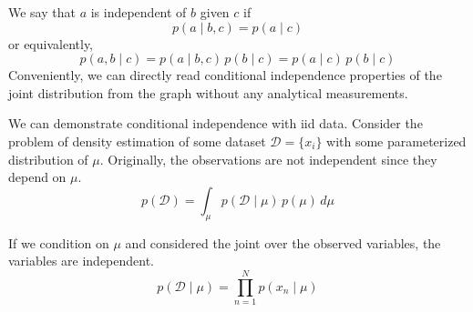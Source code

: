 \documentclass{article}
\begin{document}
  \begin{definition}
    We say that $a$ is independent of $b$ given $c$ if 
    \[p(a \mid b, c) = p(a \mid c)\]
    or equivalently, 
    \[p(a, b \mid c) = p(a \mid b, c)\, p(b \mid c) = p(a \mid c) \, p(b \mid c)\]
    Conveniently, we can directly read conditional independence properties of the joint distribution from the graph without any analytical measurements. 
  \end{definition}

  \begin{example}
    We can demonstrate conditional independence with iid data. Consider the problem of density estimation of some dataset $\mathcal{D} = \{x_i\}$ with some parameterized distribution of $\mu$. Originally, the observations are not independent since they depend on $\mu$. 
    \begin{equation}
      p(\mathcal{D}) = \int_{\mu} p(\mathcal{D} \mid \mu) \, p(\mu)\, d\mu 
    \end{equation}

    \begin{figure}[H]
      \centering 
      \caption{}
      \label{fig:conditional_indep_iid_1}
    \end{figure}

    If we condition on $\mu$ and considered the joint over the observed variables, the variables are independent. 
    \begin{equation}
      p(\mathcal{D} \mid \mu) = \prod_{n=1}^N p(x_n \mid \mu)
    \end{equation}

    \begin{figure}[H]
      \centering 
\end{figure}
\end{example}
\end{document}
